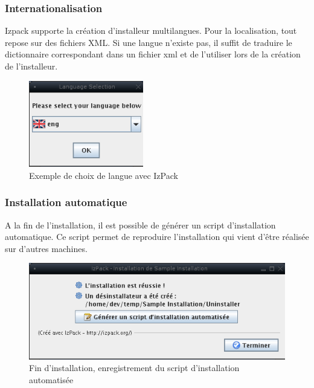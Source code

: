 \subsubsection{Internationalisation}
Izpack supporte la création d'installeur multilangues. Pour la localisation, tout repose sur des fichiers XML.
Si une langue n'existe pas, il suffit de traduire le dictionnaire correspondant dans un fichier xml et de l'utiliser lors de la création de l'installeur.
\begin{figure}[H]
	\centering
	\includegraphics[width=5cm]{../image/LangChoice.png}
	\caption{Exemple de choix de langue avec IzPack}
\end{figure}
\subsubsection{Installation automatique}
A la fin de l'installation, il est possible de générer un script d'installation automatique. Ce script permet de reproduire l'installation qui vient d'être réalisée sur d'autres machines.
\begin{figure}[H]
	\centering
	\includegraphics[width=12cm]{../image/SaveInstallXML.png}
	\caption{Fin d'installation, enregistrement du script d'installation automatisée}
\end{figure}
